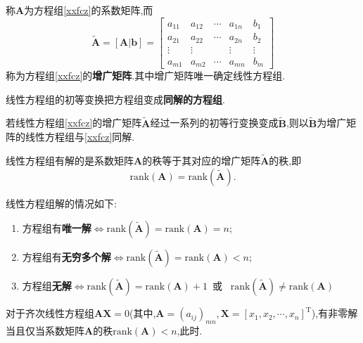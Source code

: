 \documentclass[9pt,a4paper]{book}
\begin{document}
\begin{defination}
	称$ \bm{A} $为方程组\ref{xxfcz}的系数矩阵,而
	$$
	\widetilde{\bm{A}}=[\bm{A}|\bm{b}]=
	\left[
	\begin{array}{cccc|c}
	a_{11} & a_{12} & \cdots & a_{1n}&b_1\\
	a_{21} & a_{22} & \cdots & a_{2n}&b_2\\
	\vdots & \vdots & \      & \vdots&\vdots\\
	a_{m1} & a_{m2} & \cdots & a_{mn}&b_m
	\end{array}
	\right]
	 $$
	 称为方程组\ref{xxfcz}的\textbf{增广矩阵}.其中增广矩阵唯一确定线性方程组.
\end{defination}
\begin{feature}
	线性方程组的初等变换把方程组变成\textbf{同解的方程组}.
\end{feature}
\begin{theorem}[初等行变换对于增广矩阵的同解不变性定理]若线性方程组\ref{xxfcz}的增广矩阵$ \widetilde{\bm{A}} $经过一系列的初等行变换变成$ \widetilde{\bm{B}} $,则以$ \widetilde{\bm{B}} $为增广矩阵的线性方程组与\ref{xxfcz}同解.
\end{theorem}
\begin{theorem}[线性方程组有解的充要条件]
	线性方程组有解的是系数矩阵$ \bm{A} $的秩等于其对应的增广矩阵$ \widetilde{\bm{A}} $的秩,即\[ \mathrm{rank}(\bm{A})=\mathrm{rank}(\widetilde{\bm{A}}) .\]
\end{theorem}
\begin{theorem}[线性方程组解的结构判定充分必要条件]
	线性方程组解的情况如下:\\
	\begin{enumerate}
		\item 方程组有\textbf{唯一解}$\Leftrightarrow \mathrm{rank}(\widetilde{\bm{A}})=\mathrm{rank}(\bm{A})=n; $
		\item 方程组有\textbf{无穷多个解}$\Leftrightarrow \mathrm{rank}(\widetilde{\bm{A}})=\mathrm{rank}(\bm{A})<n; $
		\item 方程组\textbf{无解}$\Leftrightarrow \mathrm{rank}(\widetilde{\bm{A}})=\mathrm{rank}(\bm{A})+1 $\ 或 \ $ \mathrm{rank}(\widetilde{\bm{A}})\neq\mathrm{rank}(\bm{A}) $
	\end{enumerate}
\end{theorem}
\begin{theorem}
	对于齐次线性方程组$ \bm{AX}=0 $(其中,$ \bm{A}=(a_{ij})_{mn},\bm{X}=[x_1,x_2,\cdots,x_n]^{\mathrm{T}} $),有非零解当且仅当系数矩阵$ \bm{A} $的秩$ \mathrm{rank}(\bm{A})<n $,此时.
\end{theorem}
\end{document}
